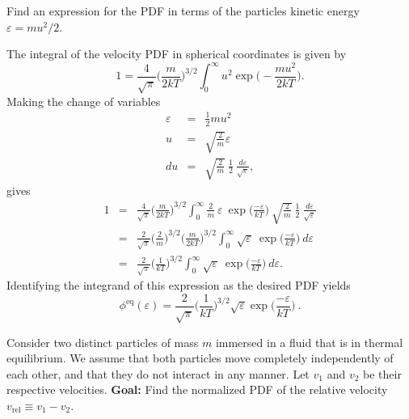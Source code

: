 
Find an expression for the PDF in terms of the particles kinetic energy $\varepsilon = m u ^2 / 2$. 

The integral of the velocity PDF in spherical coordinates is given by
\begin{equation}
1 = \frac{4}{\sqrt{\pi}} \bigg(\frac{m}{2 k T}\bigg)^{3/2} \int_{0}^{\infty} u^2 \exp\bigg(-\frac{m u^2}{2 k T}\bigg).
\end{equation}
Making the change of variables 
\begin{eqnarray*}
\varepsilon &=& \frac{1}{2} m u ^2 \\
u &=& \sqrt{\frac{2}{m}} \varepsilon \\
du &=& \sqrt{\frac{2}{m}}~\frac{1}{2}~\frac{d \varepsilon}{\sqrt{\varepsilon}},
\end{eqnarray*}
gives
\begin{eqnarray*}
1 &=& \frac{4}{\sqrt{\pi}} \bigg(\frac{m}{2 k T}\bigg)^{3/2} \int_{0}^{\infty} \frac{2}{m}~ \varepsilon~\exp\bigg(\frac{-\varepsilon}{k T}\bigg) ~ \sqrt{\frac{2}{m}}~\frac{1}{2}~\frac{d \varepsilon}{\sqrt{\varepsilon}} \\
&=& \frac{2}{\sqrt{\pi}} \bigg(\frac{2}{m}\bigg)^{3/2} \bigg(\frac{m}{2 k T}\bigg)^{3/2} \int_{0}^{\infty} \sqrt{\varepsilon} ~ \exp\bigg(\frac{-\varepsilon}{k T}\bigg)~d \varepsilon\\
&=& \frac{2}{\sqrt{\pi}} \bigg(\frac{1}{k T}\bigg)^{3/2} \int_{0}^{\infty} \sqrt{\varepsilon}~ \exp\bigg(\frac{-\varepsilon}{k T}\bigg)~d \varepsilon.
\end{eqnarray*}
Identifying the integrand of this expression as the desired PDF yields
\begin{equation}
\boxed{\phi^{\text{eq}}(\varepsilon) = \frac{2}{\sqrt{\pi}} \bigg(\frac{1}{k T}\bigg)^{3/2} \sqrt{\varepsilon} \exp\bigg(\frac{-\varepsilon}{k T}\bigg)}~.
\end{equation}


Consider two distinct particles of mass $m$ immersed in a fluid that is in thermal equilibrium. We assume that both particles move completely independently of each other, and that they do not interact in any manner. Let $v_1$ and $v_2$ be their respective velocities. \textbf{Goal:} Find the normalized PDF of the relative velocity $v_\text{rel} \equiv v_1-v_2$.

